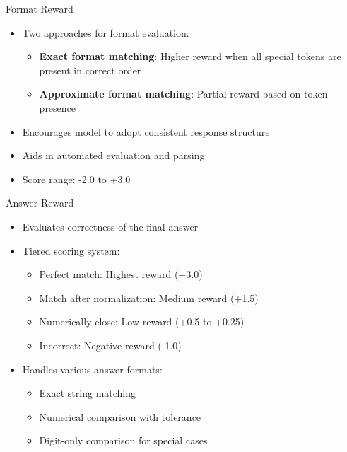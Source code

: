 \documentclass{beamer}
\begin{document}
\begin{frame}{Format Reward}
  \begin{itemize}
    \item Two approaches for format evaluation:
    \begin{itemize}
      \item \textbf{Exact format matching}: Higher reward when all special tokens are present in correct order
      \item \textbf{Approximate format matching}: Partial reward based on token presence
    \end{itemize}
    \item Encourages model to adopt consistent response structure
    \item Aids in automated evaluation and parsing
    \item Score range: -2.0 to +3.0
  \end{itemize}
\end{frame}

\begin{frame}{Answer Reward}
  \begin{itemize}
    \item Evaluates correctness of the final answer
    \item Tiered scoring system:
    \begin{itemize}
      \item Perfect match: Highest reward (+3.0)
      \item Match after normalization: Medium reward (+1.5)
      \item Numerically close: Low reward (+0.5 to +0.25)
      \item Incorrect: Negative reward (-1.0)
    \end{itemize}
    \item Handles various answer formats:
    \begin{itemize}
      \item Exact string matching
      \item Numerical comparison with tolerance
      \item Digit-only comparison for special cases
    \end{itemize}
  \end{itemize}
\end{frame}
\end{document}
